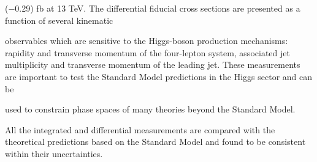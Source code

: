(−0.29) fb at 13 TeV. The differential fiducial cross sections are presented as a function of several kinematic

observables which are sensitive to the Higgs-boson production mechanisms: rapidity and transverse momentum of the four-lepton system, associated jet multiplicity and transverse momentum of the leading jet. These measurements are important to test the Standard Model predictions in the Higgs sector and can be

used to constrain phase spaces of many theories beyond the Standard Model.

All the integrated and differential measurements are compared with the theoretical predictions based on the Standard Model and found to be consistent within their uncertainties.


